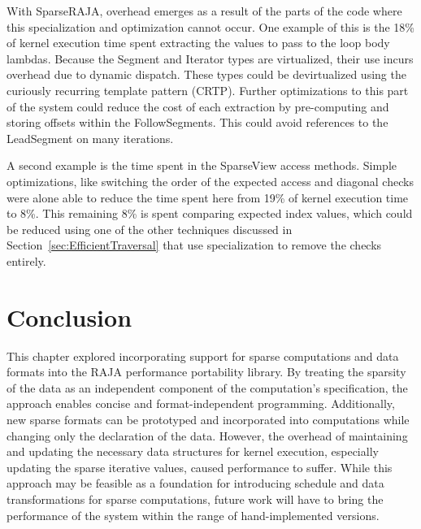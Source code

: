With SparseRAJA, overhead emerges as a result of the parts of the code where this specialization and optimization cannot occur.
One example of this is the 18\% of \GauSei{} kernel execution time spent extracting the values to pass to the loop body lambdas.
Because the Segment and Iterator types are virtualized, their use incurs overhead due to dynamic dispatch.
These types could be devirtualized using the curiously recurring template pattern (CRTP).
Further optimizations to this part of the system could reduce the cost of each extraction by pre-computing and storing offsets within the FollowSegments.
This could avoid references to the LeadSegment on many iterations.

A second example is the time spent in the SparseView access methods.
Simple optimizations, like switching the order of the expected access and diagonal checks were alone able to reduce the time spent here from 19\% of kernel execution time to 8\%.
This remaining 8\% is spent comparing expected index values, which could be reduced using one of the other techniques discussed in Section~\ref{sec:EfficientTraversal} that use specialization to remove the checks entirely.  


\section{Conclusion}

This chapter explored incorporating support for sparse computations and data formats into the RAJA performance portability library.
By treating the sparsity of the data as an independent component of the computation's specification, the approach enables concise and format-independent programming. 
Additionally, new sparse formats can be prototyped and incorporated into computations while changing only the declaration of the data.
However, the overhead of maintaining and updating the necessary data structures for kernel execution, especially updating the sparse iterative values, caused performance to suffer.
While this approach may be feasible as a foundation for introducing schedule and data transformations for sparse computations, future work will have to bring the performance of the system within the range of hand-implemented versions.





